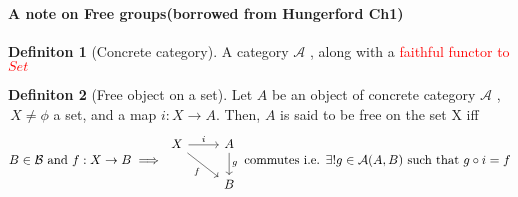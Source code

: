 \documentclass{article}
\theoremstyle{definition}
\theoremstyle{definition}
\newtheorem{definition}{Definiton}[section]
\begin{document}
\paragraph{A note on Free groups(borrowed from Hungerford Ch1)}
\begin{definition}[Concrete category] %
	A category $ \mathcal{A}  $ , along with a \textcolor{red}{ faithful functor to $ Set $ }
\end{definition}

\begin{definition}[Free object on a set] %
	Let $ A $ be an object of concrete category $ \mathcal{A}  $ ,$ \, X \neq \phi $ a set, and a map $ i:X \rightarrow A $. Then, $ A $ is said to be free on the set X iff
	\begin{equation*}
		B\in \mathcal{B} \text{ and }f:X\rightarrow B\implies
		\begin{tikzcd}
			X \arrow{r}{i} \arrow [swap]{dr}{f} & A \arrow{d}{g} \\ & B
		\end{tikzcd}
		\text{ commutes i.e. }\exists! g \in \mathcal{A}(A,B)\text{ such that } g \circ i = f
	\end{equation*}




\end{definition}
\end{document}
